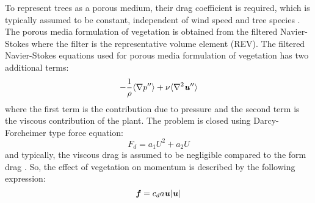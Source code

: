 To represent trees as a porous medium, their drag coefficient is required, which is typically assumed to be constant, independent of wind speed and tree species \citep{Wilson1977}. The porous media formulation of vegetation is obtained from the filtered Navier-Stokes where the filter is the representative volume element (REV). The filtered Navier-Stokes equations used for porous media formulation of vegetation has two additional terms:
\begin{equation}
-\frac{1}{\rho}\langle \nabla p'' \rangle + \nu \langle \nabla^2 \textbf{\textit{u}}'' \rangle
\end{equation}
where the first term is the contribution due to pressure and the second term is the viscous contribution of the plant. The problem is closed using Darcy-Forcheimer type force equation: 
\begin{equation}
F_{d} =  a_1 U^2 + a_2 U 
\end{equation}
and typically, the viscous drag is assumed to be negligible compared to the form drag \citep{Raupach1981, Sanz2003}. So, the effect of vegetation on momentum is described by the following expression:
\begin{equation}
\textbf{\textit{f}} = c_d a \textbf{\textit{u}}|\textbf{\textit{u}}|
\end{equation}
